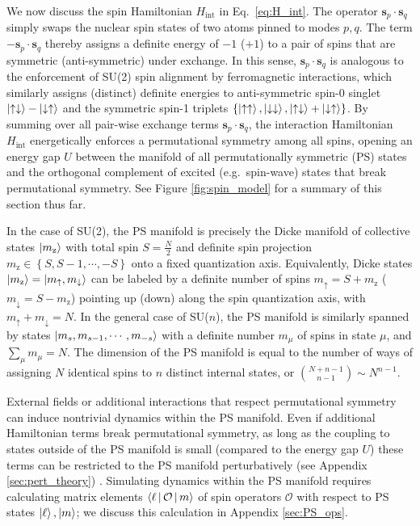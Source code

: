 \documentclass[nofootinbib,twocolumn]{revtex4-2}
\renewcommand{\t}{\text} %
\renewcommand{\set}[1]{\left\{#1\right\}} %
\newcommand{\bk}{\Braket} %
\renewcommand{\v}{\bm} %
\renewcommand{\c}{\cdot} %
\newcommand{\1}{\mathds{1}}
\newcommand{\up}{\uparrow}
\newcommand{\dn}{\downarrow}
\newcommand{\z}{\text{z}}
\renewcommand{\O}{\mathcal{O}}
\begin{document}
We now discuss the spin Hamiltonian $H_{\t{int}}$ in Eq.~\eqref{eq:H_int}.
The operator $\v s_p\c\v s_q$ simply swaps the nuclear spin states of two atoms pinned to modes $p,q$.
The term $-\v s_p\c\v s_q$ thereby assigns a definite energy of $-1$ ($+1$) to a pair of spins that are symmetric (anti-symmetric) under exchange.
In this sense, $\v s_p\c\v s_q$ is analogous to the enforcement of SU(2) spin alignment by ferromagnetic interactions, which similarly assigns (distinct) definite energies to anti-symmetric spin-0 singlet $\ket{\up\dn}-\ket{\dn\up}$ and the symmetric spin-1 triplets $\set{\ket{\up\up},\ket{\dn\dn},\ket{\up\dn}+\ket{\dn\up}}$.
By summing over all pair-wise exchange terms $\v s_p\c\v s_q$, the interaction Hamiltonian $H_{\t{int}}$ energetically enforces a permutational symmetry among all spins, opening an energy gap $U$ between the manifold of all permutationally symmetric (PS) states and the orthogonal complement of excited (e.g.~spin-wave) states that break permutational symmetry.
See Figure \ref{fig:spin_model} for a summary of this section thus far.

In the case of SU(2), the PS manifold is precisely the Dicke manifold of collective states $\ket{m_\z}$ with total spin $S=\frac{N}{2}$ and definite spin projection $m_\z\in\set{S,S-1,\cdots,-S}$ onto a fixed quantization axis.
Equivalently, Dicke states $\ket{m_\z}=\ket{m_\up,m_\dn}$ can be labeled by a definite number of spins $m_\up=S+m_\z$ ($m_\dn=S-m_\z$) pointing up (down) along the spin quantization axis, with $m_\up+m_\dn=N$.
In the general case of SU($n$), the PS manifold is similarly spanned by states $\ket{m_s,m_{s-1},\cdots,m_{-s}}$ with a definite number $m_\mu$ of spins in state $\mu$, and $\sum_\mu m_\mu=N$.
The dimension of the PS manifold is equal to the number of ways of assigning $N$ identical spins to $n$ distinct internal states, or ${N+n-1 \choose n-1} \sim N^{n-1}$.

External fields or additional interactions that respect permutational symmetry can induce nontrivial dynamics within the PS manifold.
Even if additional Hamiltonian terms break permutational symmetry, as long as the coupling to states outside of the PS manifold is small (compared to the energy gap $U$) these terms can be restricted to the PS manifold perturbatively (see Appendix \ref{sec:pert_theory}) \cite{bravyi2011schrieffer}.
Simulating dynamics within the PS manifold requires calculating matrix elements $\bk{\ell|\O|m}$ of spin operators $\O$ with respect to PS states $\ket\ell,\ket{m}$; we discuss this calculation in Appendix \ref{sec:PS_ops}.
\end{document}
